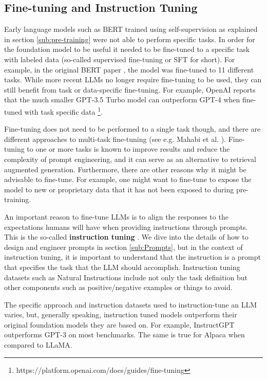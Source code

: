 \documentclass[conference]{IEEEtran}
\begin{document}
\subsection{Fine-tuning and Instruction Tuning}
Early language models such as BERT trained using self-supervision as explained in section \ref{sub:pre-training} were not able to perform specific tasks. In order for the foundation model to be useful it needed to be fine-tuned to a specific task with labeled data (so-called supervised fine-tuning or SFT for short). For example, in the original BERT paper \cite{devlin2018bert}, the model was fine-tuned to 11 different tasks. While more recent LLMs no longer require fine-tuning to be used, they can still benefit from task or data-specific fine-tuning. For example, OpenAI reports that the much smaller GPT-3.5 Turbo model can outperform GPT-4 when fine-tuned with task specific data \footnote{https://platform.openai.com/docs/guides/fine-tuning}.

Fine-tuning does not need to be performed to a single task though, and there are different approaches to multi-task fine-tuning (see e.g. Mahabi et al. \cite{mahabadi2021parameterefficient}). Fine-tuning to one or more tasks is known to improve results and reduce the complexity of prompt engineering, and it can serve as an alternative to retrieval augmented generation. Furthermore, there are other reasons why it might be advisable to fine-tune. For example, one might want to fine-tune to expose the model to new or proprietary data that it has not been exposed to during pre-training.

An important reason to fine-tune LLMs is to align the responses to the expectations humans will have when providing instructions through prompts. This is the so-called \textbf{instruction tuning} \cite{zhang2023instruction}. We dive into the details of how to design and engineer prompts in section \ref{sub:Prompts}, but in the context of instruction tuning, it is important to understand that the instruction is a prompt that specifies the task that the LLM should accomplish. Instruction tuning datasets such as Natural Instructions \cite{mishra2021cross} include not only the task definition but other components such as positive/negative examples or things to avoid.

The specific approach and instruction datasets used to instruction-tune an LLM varies, but, generally speaking, instruction tuned models outperform their original foundation models they are based on. For example, InstructGPT \cite{ouyang2022training} outperforms GPT-3 on most benchmarks. The same is true for Alpaca \cite{taori2023alpaca} when compared to LLaMA.
\end{document}
